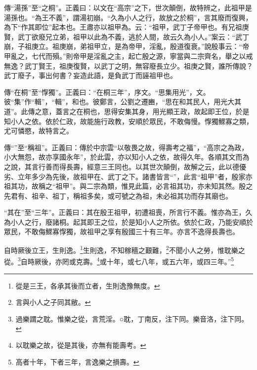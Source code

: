 {\noindent\zhuan{}\fzbyks 傳“湯孫”至“之桐”。正義曰：以文在“高宗”之下，世次顛倒，故特辨之，此祖甲是湯孫也。“為王不義”，謂湯初崩。“久為小人之行，故放之於桐”，言其廢而復興，為下“作其即位”起本也。王肅亦以祖甲為。云：“祖甲，武丁子帝甲也。有兄祖庚賢，武丁欲廢兄立弟，祖甲以此為不義，逃於人間，故云久為小人。”案云：“武丁崩，子祖庚立。祖庚崩，弟祖甲立，是為帝甲，淫亂，殷道復衰。”說殷事云：“帝甲亂之，七代而殞。”則帝甲是淫亂之主，起亡殷之源，寧當與二宗齊名，舉之以戒無逸？武丁賢王，祖庚復賢，以武丁之明，無容廢長立少。祖庚之賢，誰所傳說？武丁廢子，事出何書？妄造此語，是負武丁而誣祖甲也。 \par}

{\noindent\zhuan{}\fzbyks 傳“在桐”至“惸獨”。正義曰：“在桐三年”，序文。“思集用光”，文。彼“集”作“輯”，“輯”，和也。彼鄭言，公劉之遷豳，“思在和其民人，用光大其道”。此傳之意，蓋言之在桐也，思得安集其身，用光顯王政，故起即王位，於是知小人之依。依於仁政，故能施行政教，安順於眾民，不敢侮慢。惸獨鰥寡之類，尤可憐愍，故特言之。 \par}

{\noindent\zhuan{}\fzbyks 傳“”至“稱祖”。正義曰：傳於中宗雲“以敬畏之故，得壽考之福”，“高宗之為政，小大無怨，故亦享國永年”，於此雲，亦以知小人之依，故得久年。各順其文而為之說，其言行善而得長壽，經意三王同也。以其世次顛倒，故解之云，此以德優劣、立年多少為先後，故祖甲在、武丁之下。諸書皆言“”，此言“祖甲”者，殷家亦祖其功，故稱之“祖甲”。與二宗為類，惟見此篇，必言祖其功，亦未知其然。殷之先君有、祖辛、祖丁，稱祖多矣，或可號之為祖，未必祖其功而存其廟也。 \par}

{\noindent\shu{}\fzkt “其在”至“三年”。正義曰：其在殷王祖甲，初遭祖喪，所言行不義。惟亦為王，久為小人之行，廢諸桐。起其即王之位，於是知小人之所依。依於仁政，乃能安順於眾民，不敢侮鰥寡惸獨，故祖甲之享有殷國三十有三年。亦言不逸得長壽也。 \par}

自時厥後立王，生則逸。\footnote{從是三王，各承其後而立者，生則逸豫無度。}生則逸，不知稼穡之艱難，\footnote{言與小人之子同其敝。}不聞小人之勞，惟耽樂之從。\footnote{過樂謂之耽。惟樂之從，言荒淫。○耽，丁南反，注下同。樂音洛，注下同。}自時厥後，亦罔或克壽。\footnote{以耽樂之故，從是其後，亦無有能壽考。}或十年，或七八年，或五六年，或四三年。”\footnote{高者十年，下者三年，言逸樂之損壽。}


